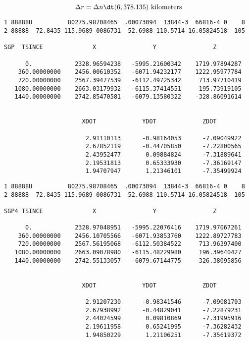\[\Delta r=\Delta n\dt(6,378.135) \mbox{ kilometers}\]
\newpage
\begin{verbatim}
1 88888U          80275.98708465  .00073094  13844-3  66816-4 0    8
2 88888  72.8435 115.9689 0086731  52.6988 110.5714 16.05824518  105

SGP  TSINCE              X                Y                Z

      0.            2328.96594238   -5995.21600342    1719.97894287
    360.00000000    2456.00610352   -6071.94232177    1222.95977784
    720.00000000    2567.39477539   -6112.49725342     713.97710419
   1080.00000000    2663.03179932   -6115.37414551     195.73919105
   1440.00000000    2742.85470581   -6079.13580322    -328.86091614


                      XDOT             YDOT             ZDOT

                       2.91110113      -0.98164053      -7.09049922
                       2.67852119      -0.44705850      -7.22800565
                       2.43952477       0.09884824      -7.31889641
                       2.19531813       0.65333930      -7.36169147
                       1.94707947       1.21346101      -7.35499924
\end{verbatim}
\newpage
\begin{verbatim}
1 88888U          80275.98708465  .00073094  13844-3  66816-4 0    8
2 88888  72.8435 115.9689 0086731  52.6988 110.5714 16.05824518  105

SGP4 TSINCE              X                Y                Z

      0.            2328.97048951   -5995.22076416    1719.97067261
    360.00000000    2456.10705566   -6071.93853760    1222.89727783
    720.00000000    2567.56195068   -6112.50384522     713.96397400
   1080.00000000    2663.09078980   -6115.48229980     196.39640427
   1440.00000000    2742.55133057   -6079.67144775    -326.38095856


                      XDOT             YDOT             ZDOT

                       2.91207230      -0.98341546      -7.09081703
                       2.67938992      -0.44829041      -7.22879231
                       2.44024599       0.09810869      -7.31995916
                       2.19611958       0.65241995      -7.36282432
                       1.94850229       1.21106251      -7.35619372
\end{verbatim}
\newpage
